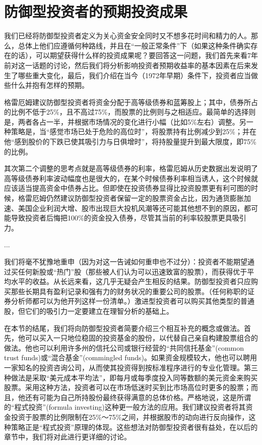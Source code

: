 \documentclass[12pt,oneside]{book}
\begin{document}
\section{防御型投资者的预期投资成果}
我们已经将防御型投资者定义为关心资金安全同时又不想多花时间和精力的人。那么，总体上他们应遵循何种路线，并且在“一般正常条件”下（如果这种条件确实存在的话），可以期望获得什么样的投资成果呢？要回答这一问题，我们首先来看7年前对这一话题的讨论，然后我们将分析影响投资者预期收益率的基本因素在后来发生了哪些重大变化，最后，我们介绍在当今（1972年早期）条件下，投资者应当做些什么并抱有怎样的预期。

格雷厄姆建议防御型投资者将资金分配于高等级债券和蓝筹股上；其中，债券所占的比例不低于25\%，且不高过75\%，而股票的比例则与之相适应。最简单的选择则是，两者各占一半，并根据市场情况的变化进行小幅（比如5\%左右）调整。另一种策略是，当“感觉市场已处于危险的高位时”，将股票持有比例减少到25\%；并在他“感到股价的下跌已使其吸引力与日俱增时”，将持股量提升到最大限度，即75\%的比例。

其次第二个调整的思考点就是高等级债券的利率，格雷厄姆从历史数据出发说明了高等级债券利率波动幅度也是很大的，在某个时候债券利率相当诱人，这个时候就应该适当提高资金中债券占比。但即使在投资债券显得比投资股票更有利可图的时候，格雷厄姆仍然建议防御型投资者保留一定的股票资金占比，因为通货膨胀加速、美国企业利润大增、股市出现巨大投机风潮等还可能其他想不到的原因，都可能导致投资者后悔把100\%的资金投入债券，尽管其当前的利率较股票更具吸引力。

...

我们将毫不犹豫地重申（因为对这一告诫如何重申也不过分）：投资者不能期望通过买任何新股或“热门”股（那些被人们认为可以迅速致富的股票），而获得优于平均水平的收益。从长远来看，这几乎无疑会产生相反的结果。防御型投资者只应购买那些长期具有盈利记录和强有力的财务状况的重要公司的股票。（任何称职的证券分析师都可以为他开列这样一份清单。）激进型投资者可以购买其他类型的普通股，但它们的吸引力一定要建立在理智分析的基础上。

在本节的结尾，我们将向防御型投资者简要介绍三个相互补充的概念或做法。首先，他可以买入一只地位稳固的投资基金的股份，以代替自己亲自构建股票组合的做法。他也可以利用许多州的信托公司或银行经营的“共同信托基金”(common trust funds)或“混合基金”(commingled funds)。如果资金规模较大，他也可以聘用一家知名的投资咨询公司，从而使其投资得到按标准程序进行的专业化管理。第三种做法是采取“美元成本平均法”，即每月或每季度投入同等数额的美元资金来购买股票。采用这种方法，投资者可以在市场低迷时买到比市场高位时更多的股票；而且，他还有可能为自己所持股份最终获得满意的总体价格。严格地说，这是所谓的“程式投资”(formula investing)这种更一般方法的应用。我们建议投资者将其资金投资于股票的比例限制在25\%～75\%之间，并根据股市的动向进行反向操作，这种策略正是“程式投资”原理的体现。这些想法对防御型投资者很有益处，在以后的章节中，我们将对此进行更详细的讨论。
\end{document}
